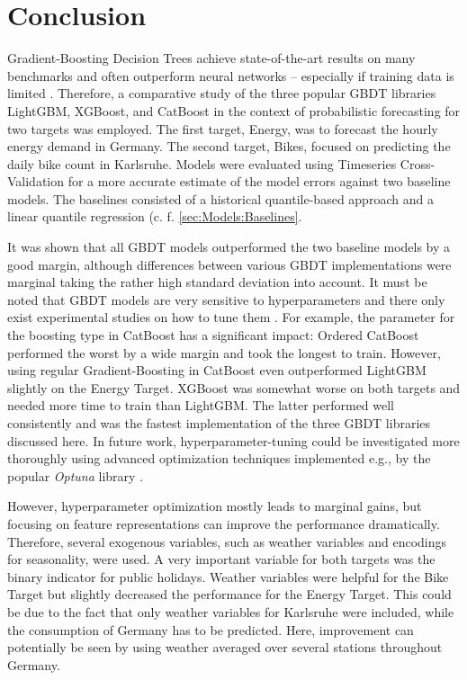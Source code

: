 \newpage
\section{Conclusion}
\label{ch:Conclusion}

Gradient-Boosting Decision Trees achieve state-of-the-art results on many benchmarks and often outperform neural networks -- especially if training data is limited \parencites{shwartz-ziv_tabular_2021, grinsztajn_why_2022}. Therefore, a comparative study of the three popular GBDT libraries LightGBM, XGBoost, and CatBoost in the context of probabilistic forecasting for two targets was employed. The first target, Energy, was to forecast the hourly energy demand in Germany. The second target, Bikes, focused on predicting the daily bike count in Karlsruhe. Models were evaluated using Timeseries Cross-Validation for a more accurate estimate of the model errors against two baseline models. The baselines consisted of a historical quantile-based approach and a linear quantile regression (c. f. \cref{sec:Models:Baselines}.

It was shown that all GBDT models outperformed the two baseline models by a good margin, although differences between various GBDT implementations were marginal taking the rather high standard deviation into account. It must be noted that GBDT models are very sensitive to hyperparameters and there only exist experimental studies on how to tune them \parencites{florek_benchmarking_2023, bentejac_comparative_2021}. For example, the parameter for the boosting type in CatBoost has a significant impact: Ordered CatBoost performed the worst by a wide margin and took the longest to train. However, using regular Gradient-Boosting in CatBoost even outperformed LightGBM slightly on the Energy Target. XGBoost was somewhat worse on both targets and needed more time to train than LightGBM. The latter performed well consistently and was the fastest implementation of the three GBDT libraries discussed here. In future work, hyperparameter-tuning could be investigated more thoroughly using advanced optimization techniques implemented e.g., by the popular \textit{Optuna} library \parencite{akiba_optuna_2019}.

However, hyperparameter optimization mostly leads to marginal gains, but focusing on feature representations can improve the performance dramatically. Therefore, several exogenous variables, such as weather variables and encodings for seasonality, were used. A very important variable for both targets was the binary indicator for public holidays. Weather variables were helpful for the Bike Target but slightly decreased the performance for the Energy Target. This could be due to the fact that only weather variables for Karlsruhe were included, while the consumption of Germany has to be predicted. Here, improvement can potentially be seen by using weather averaged over several stations throughout Germany.

